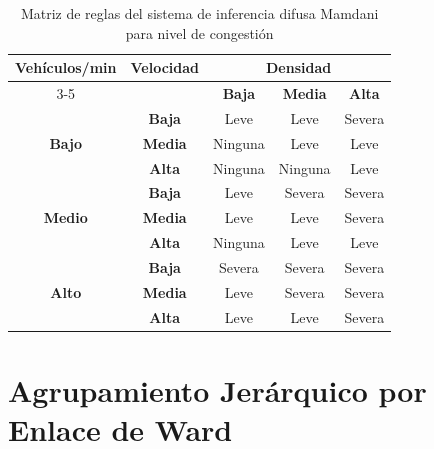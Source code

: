 \begin{table}[htbp]
\renewcommand{\arraystretch}{1.3}
\caption{Matriz de reglas del sistema de inferencia difusa Mamdani para nivel de congestión}
\label{tab:fuzzy_rules}
\centering
\footnotesize
\begin{tabular}{cc|ccc}
\toprule
\multirow{2}{*}{\textbf{Vehículos/min}} & \multirow{2}{*}{\textbf{Velocidad}} & \multicolumn{3}{c}{\textbf{Densidad}} \\
\cmidrule{3-5}
& & \textbf{Baja} & \textbf{Media} & \textbf{Alta} \\
\midrule

\multirow{3}{*}{\textbf{Bajo}} 
& \textbf{Baja}  & \cellcolor{yellow!40}Leve & \cellcolor{yellow!40}Leve & \cellcolor{red!40}Severa \\
& \textbf{Media} & \cellcolor{green!30}Ninguna & \cellcolor{yellow!40}Leve & \cellcolor{yellow!40}Leve \\
& \textbf{Alta}  & \cellcolor{green!30}Ninguna & \cellcolor{green!30}Ninguna & \cellcolor{yellow!40}Leve \\
\midrule

\multirow{3}{*}{\textbf{Medio}} 
& \textbf{Baja}  & \cellcolor{yellow!40}Leve & \cellcolor{red!40}Severa & \cellcolor{red!40}Severa \\
& \textbf{Media} & \cellcolor{yellow!40}Leve & \cellcolor{yellow!40}Leve & \cellcolor{red!40}Severa \\
& \textbf{Alta}  & \cellcolor{green!30}Ninguna & \cellcolor{yellow!40}Leve & \cellcolor{yellow!40}Leve \\
\midrule

\multirow{3}{*}{\textbf{Alto}} 
& \textbf{Baja}  & \cellcolor{red!40}Severa & \cellcolor{red!40}Severa & \cellcolor{red!40}Severa \\
& \textbf{Media} & \cellcolor{yellow!40}Leve & \cellcolor{red!40}Severa & \cellcolor{red!40}Severa \\
& \textbf{Alta}  & \cellcolor{yellow!40}Leve & \cellcolor{yellow!40}Leve & \cellcolor{red!40}Severa \\
\bottomrule
\end{tabular}
\end{table}

\section{Agrupamiento Jerárquico por Enlace de Ward}
\label{subsec:clustering_traffic_sync}

